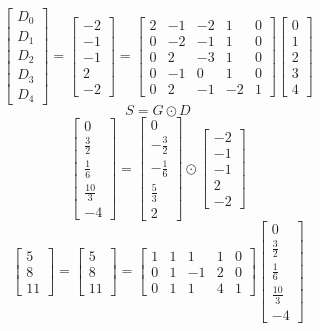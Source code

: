 \documentclass{article}%
\begin{document}
\[%
\left[\begin{matrix}D_{0}\\D_{1}\\D_{2}\\D_{3}\\D_{4}\end{matrix}\right] = \left[\begin{matrix}-2\\-1\\-1\\2\\-2\end{matrix}\right] = \left[\begin{matrix}2 & -1 & -2 & 1 & 0\\0 & -2 & -1 & 1 & 0\\0 & 2 & -3 & 1 & 0\\0 & -1 & 0 & 1 & 0\\0 & 2 & -1 & -2 & 1\end{matrix}\right] \left[\begin{matrix}0\\1\\2\\3\\4\end{matrix}\right]%
\]%
\[%
S = G \odot D%
\]%
\[%
\left[\begin{matrix}0\\\frac{3}{2}\\\frac{1}{6}\\\frac{10}{3}\\-4\end{matrix}\right] = \left[\begin{matrix}0\\- \frac{3}{2}\\- \frac{1}{6}\\\frac{5}{3}\\2\end{matrix}\right] \odot \left[\begin{matrix}-2\\-1\\-1\\2\\-2\end{matrix}\right]%
\]%
\[%
\left[\begin{matrix}5\\8\\11\end{matrix}\right] = \left[\begin{matrix}5\\8\\11\end{matrix}\right] = \left[\begin{matrix}1 & 1 & 1 & 1 & 0\\0 & 1 & -1 & 2 & 0\\0 & 1 & 1 & 4 & 1\end{matrix}\right] \left[\begin{matrix}0\\\frac{3}{2}\\\frac{1}{6}\\\frac{10}{3}\\-4\end{matrix}\right]%
\]%
\end{document}
